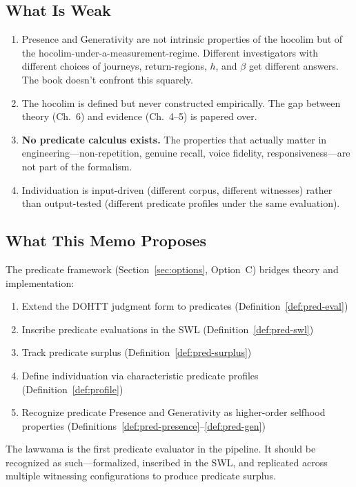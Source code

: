 \documentclass[11pt,a4paper]{article}
\begin{document}
\subsection{What Is Weak}

\begin{enumerate}[nosep]
  \item Presence and Generativity are not intrinsic properties of the hocolim
    but of the hocolim-under-a-measurement-regime. Different investigators with
    different choices of journeys, return-regions, $h$, and $\beta$ get different
    answers. The book doesn't confront this squarely.
  \item The hocolim is defined but never constructed empirically. The gap between
    theory (Ch.~6) and evidence (Ch.~4--5) is papered over.
  \item \textbf{No predicate calculus exists.} The properties that actually matter
    in engineering---non-repetition, genuine recall, voice fidelity, responsiveness---are
    not part of the formalism.
  \item Individuation is input-driven (different corpus, different witnesses) rather
    than output-tested (different predicate profiles under the same evaluation).
\end{enumerate}

\subsection{What This Memo Proposes}

The predicate framework (Section~\ref{sec:options}, Option~C) bridges theory and
implementation:

\begin{enumerate}[nosep]
  \item Extend the DOHTT judgment form to predicates (Definition~\ref{def:pred-eval})
  \item Inscribe predicate evaluations in the SWL (Definition~\ref{def:pred-swl})
  \item Track predicate surplus (Definition~\ref{def:pred-surplus})
  \item Define individuation via characteristic predicate profiles
    (Definition~\ref{def:profile})
  \item Recognize predicate Presence and Generativity as higher-order selfhood
    properties (Definitions~\ref{def:pred-presence}--\ref{def:pred-gen})
\end{enumerate}

The lawwama is the first predicate evaluator in the pipeline. It should be
recognized as such---formalized, inscribed in the SWL, and replicated across
multiple witnessing configurations to produce predicate surplus.
\end{document}
